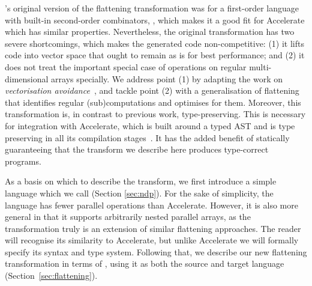 
\citet{Blelloch:compiling1988}'s original version of the flattening transformation was for a first-order language with built-in second-order combinators, \nesl{}, which makes it a good fit for Accelerate which has similar properties. Nevertheless, the original transformation has two severe shortcomings, which makes the generated code non-competitive: (1) it lifts code into vector space that ought to remain as is for best performance; and (2) it does not treat the important special case of operations on regular multi-dimensional arrays specially. We address point (1) by adapting the work on \emph{vectorisation avoidance}~\citep{Keller:avoidance}, and tackle point (2) with a generalisation of flattening that identifies regular (sub)computations and optimises for them. Moreover, this transformation is, in contrast to previous work, type-preserving. This is necessary for integration with Accelerate, which is built around a typed AST and is type preserving in all its compilation stages~\cite{McDonell:2015:acc-llvm}. It has the added benefit of statically guaranteeing that the transform we describe here produces type-correct programs.

As a basis on which to describe the transform, we first introduce a simple language which we call \ndp{} (Section \ref{sec:ndp}). For the sake of simplicity, the language has fewer parallel operations than Accelerate. However, it is also more general in that it supports arbitrarily nested parallel arrays, as the transformation truly is an extension of similar flattening approaches. The reader will recognise its similarity to Accelerate, but unlike Accelerate we will formally specify its syntax and type system. Following that, we describe our new flattening transformation in terms of \ndp{}, using it as both the source and target language (Section~\ref{sec:flattening}).

\section{\ndp{}}

